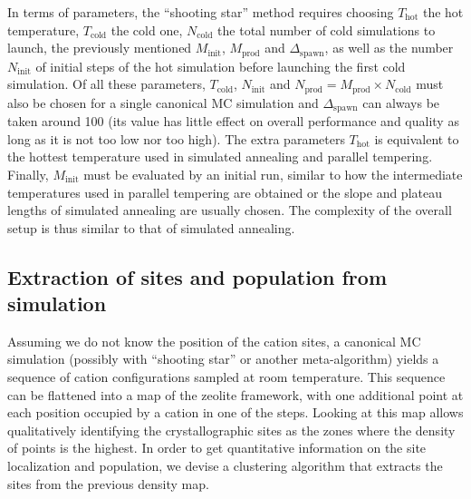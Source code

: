 \documentclass[main.tex]{subfiles}
\begin{document}
In terms of parameters, the ``shooting star'' method requires choosing $T_\text{hot}$ the hot temperature, $T_\text{cold}$ the cold one, $N_\text{cold}$ the total number of cold simulations to launch, the previously mentioned $M_\text{init}$, $M_\text{prod}$ and $\Delta_\text{spawn}$, as well as the number $N_\text{init}$ of initial steps of the hot simulation before launching the first cold simulation. Of all these parameters, $T_\text{cold}$, $N_\text{init}$ and $N_\text{prod} = M_\text{prod}\times N_\text{cold}$ must also be chosen for a single canonical MC simulation and $\Delta_\text{spawn}$ can always be taken around 100 (its value has little effect on overall performance and quality as long as it is not too low nor too high). The extra parameters $T_\text{hot}$ is equivalent to the hottest temperature used in simulated annealing and parallel tempering. Finally, $M_\text{init}$ must be evaluated by an initial run, similar to how the intermediate temperatures used in parallel tempering are obtained or the slope and plateau lengths of simulated annealing are usually chosen. The complexity of the overall setup is thus similar to that of simulated annealing.


\subsection{Extraction of sites and population from simulation}

\label{siteextraction}



Assuming we do not know the position of the cation sites, a canonical MC simulation (possibly with ``shooting star'' or another meta-algorithm) yields a sequence of cation configurations sampled at room temperature. This sequence can be flattened into a map of the zeolite framework, with one additional point at each position occupied by a cation in one of the steps. Looking at this map allows qualitatively identifying the crystallographic sites as the zones where the density of points is the highest. In order to get quantitative information on the site localization and population, we devise a clustering algorithm that extracts the sites from the previous density map.
\end{document}
